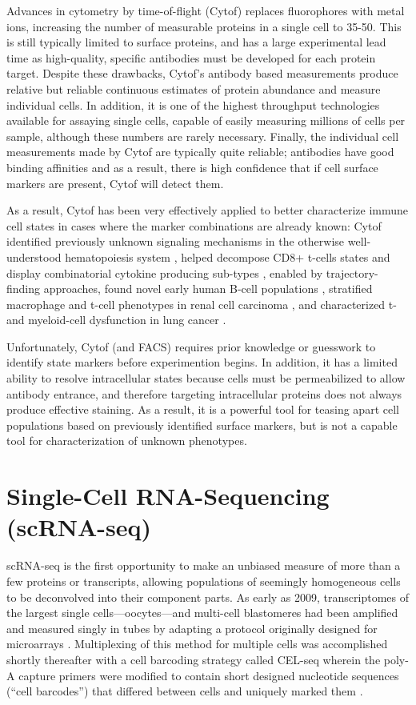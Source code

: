 Advances in cytometry by time-of-flight (Cytof) replaces fluorophores with metal ions, increasing the number of measurable proteins in a single cell to 35-50. 
This is still typically limited to surface proteins, and has a large experimental lead time as high-quality, specific antibodies must be developed for each protein target.  
Despite these drawbacks, Cytof’s antibody based measurements produce relative but reliable continuous estimates of protein abundance and measure individual cells. 
In addition, it is one of the highest throughput technologies available for assaying single cells, capable of easily measuring millions of cells per sample, although these numbers are rarely necessary. 
Finally, the individual cell measurements made by Cytof are typically quite reliable; antibodies have good binding affinities and as a result, there is high confidence that if cell surface markers are present, Cytof will detect them. 

As a result, Cytof has been very effectively applied to better characterize immune cell states in cases where the marker combinations are already known: 
Cytof identified previously unknown signaling mechanisms in the otherwise well-understood hematopoiesis system \citep{Bendall2011}, helped decompose CD8+ t-cells states and display combinatorial cytokine producing sub-types \citep{Newell2012}, enabled by trajectory-finding approaches, found novel early human B-cell populations \citep{Bendall2014}, stratified macrophage and t-cell phenotypes in renal cell carcinoma \citep{Chevrier2017}, and characterized t- and myeloid-cell dysfunction in lung cancer \citep{Lavin2017}.

Unfortunately, Cytof (and FACS) requires prior knowledge or guesswork to identify state markers before experimention begins. 
In addition, it has a limited ability to resolve intracellular states because cells must be permeabilized to allow antibody entrance, and therefore targeting intracellular proteins does not always produce effective staining. 
As a result, it is a powerful tool for teasing apart cell populations based on previously identified surface markers, but is not a capable tool for characterization of unknown phenotypes.

\section{Single-Cell RNA-Sequencing (scRNA-seq)}

scRNA-seq is the first opportunity to make an unbiased measure of more than a few proteins or transcripts, allowing populations of seemingly homogeneous cells to be deconvolved into their component parts. 
As early as 2009, transcriptomes of the largest single cells---oocytes---and multi-cell blastomeres had been amplified and measured singly in tubes by adapting a protocol originally designed for microarrays \citep{Tang2009}. 
Multiplexing of this method for multiple cells was accomplished shortly thereafter with a cell barcoding strategy called CEL-seq wherein the poly-A capture primers were modified to contain short designed nucleotide sequences (``cell barcodes'') that differed between cells and uniquely marked them \citep{Islam2011}. 

